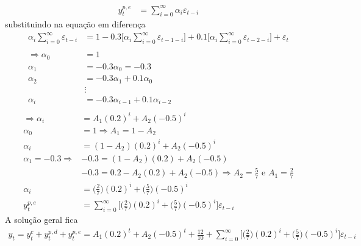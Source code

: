 \begin{enumerate}
\begin{enumerate}
	\begin{align*}
	y_t^{p,e}&=\sum\limits_{i=0}^{\infty}\alpha_i\varepsilon_{t-i}
	\end{align*}
	substituindo na equação em diferença
	\begin{align*}
	\alpha_i\sum\limits_{i=0}^{\infty}\varepsilon_{t-i}&=1-0.3\Bigg[\alpha_i\sum\limits_{i=0}^{\infty}\varepsilon_{t-1-i}\Bigg]+0.1\Bigg[\alpha_i\sum\limits_{i=0}^{\infty}\varepsilon_{t-2-i}\Bigg]+\varepsilon_t\\
	\\
	\Rightarrow \alpha_0&=1\\
	\alpha_1&=-0.3\alpha_0=-0.3\\
	\alpha_2&=-0.3\alpha_1+0.1\alpha_0\\
	&\vdots\\
	\alpha_i&=-0.3\alpha_{i-1}+0.1\alpha_{i-2}\\
	\end{align*}
	\begin{align*}
	\Rightarrow \alpha_i&=A_1(0.2)^i+A_2(-0.5)^i\\
	\alpha_0&=1 \Rightarrow A_1=1-A_2\\
	\alpha_i&=(1-A_2)(0.2)^i+A_2(-0.5)^i\\
	\alpha_1=-0.3\Rightarrow &-0.3=(1-A_2)(0.2)+A_2(-0.5)\\
	&-0.3=0.2-A_2(0.2)+A_2(-0.5)\Rightarrow A_2=\frac{5}{7} \text{ e }A_1=\frac{2}{7}\\
	\alpha_i&=\bigg(\frac{2}{7}\bigg)(0.2)^i+\bigg(\frac{5}{7}\bigg)(-0.5)^i\\
	y_t^{p,e}&=\sum\limits_{i=0}^{\infty}\Bigg[\bigg(\frac{2}{7}\bigg)(0.2)^i+\bigg(\frac{5}{7}\bigg)(-0.5)^i\Bigg]\varepsilon_{t-i}
\end{align*}
	A solução geral fica
	\begin{align*}
	y_t=y_t^c+y_t^{p,d}+y_t^{p,e}=A_1(0.2)^t+A_2(-0.5)^t+\frac{12}{10}+\sum\limits_{i=0}^{\infty}\Bigg[\bigg(\frac{2}{7}\bigg)(0.2)^i+\bigg(\frac{5}{7}\bigg)(-0.5)^i\Bigg]\varepsilon_{t-i}
	\end{align*}
\end{enumerate}
			
\end{enumerate}

